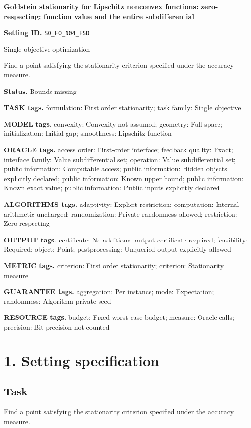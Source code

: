 \documentclass[10pt,a4paper]{article}
\begin{document}
\raggedright

{\LARGE\bfseries\sffamily\color{AtlasNavy} Goldstein stationarity for Lipschitz nonconvex functions: zero-respecting; function value and the entire subdifferential\par}\vspace{5pt}
\textbf{Setting ID.} \texttt{SO\_\allowbreak{}FO\_\allowbreak{}N04\_\allowbreak{}FSD}

Single-objective optimization

Find a point satisfying the stationarity criterion specified under the accuracy measure.

\textbf{Status.} Bounds missing

\textbf{TASK tags.} formulation: First order stationarity; task family: Single objective

\textbf{MODEL tags.} convexity: Convexity not assumed; geometry: Full space; initialization: Initial gap; smoothness: Lipschitz function

\textbf{ORACLE tags.} access order: First-order interface; feedback quality: Exact; interface family: Value subdifferential set; operation: Value subdifferential set; public information: Computable access; public information: Hidden objects explicitly declared; public information: Known upper bound; public information: Known exact value; public information: Public inputs explicitly declared

\textbf{ALGORITHMS tags.} adaptivity: Explicit restriction; computation: Internal arithmetic uncharged; randomization: Private randomness allowed; restriction: Zero respecting

\textbf{OUTPUT tags.} certificate: No additional output certificate required; feasibility: Required; object: Point; postprocessing: Unqueried output explicitly allowed

\textbf{METRIC tags.} criterion: First order stationarity; criterion: Stationarity measure

\textbf{GUARANTEE tags.} aggregation: Per instance; mode: Expectation; randomness: Algorithm private seed

\textbf{RESOURCE tags.} budget: Fixed worst-case budget; measure: Oracle calls; precision: Bit precision not counted

\section{1. Setting specification}
\subsection{Task}
Find a point satisfying the stationarity criterion specified under the accuracy measure.
\end{document}
